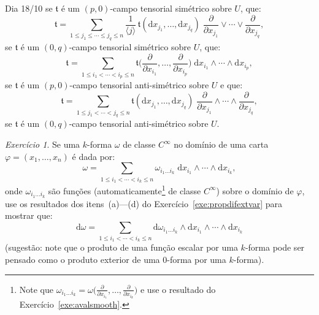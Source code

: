 \documentclass[oneside,11pt]{amsart}
\newcommand{\dd}{\mathrm d}
\theoremstyle{remark}\newtheorem{exercise}{Exercício}[section]
\theoremstyle{plain}\newtheorem{teo}{Teorema}[section]
\theoremstyle{plain}\newtheorem{lem}[teo]{Lema}
\theoremstyle{plain}\newtheorem{prop}[teo]{Proposição}
\theoremstyle{definition}\newtheorem{defin}[teo]{Definição}
\theoremstyle{remark}\newtheorem{rem}[teo]{Observação}
\theoremstyle{definition}\newtheorem{example}[teo]{Exemplo}
\numberwithin{equation}{section}
\begin{document}
\begin{section}{Dia 18/10}
se $\mathfrak t$ é um $(p,0)$-campo tensorial simétrico sobre $U$, que:
\[\mathfrak t=\sum_{1\le j_1\le\cdots\le j_q\le n}
\frac1{\langle j\rangle}\,\mathfrak t(\dd x_{j_1},\ldots,\dd x_{j_q})\;\frac{\partial}{\partial x_{j_1}}\vee\cdots\vee\frac{\partial}{\partial x_{j_q}},\]
se $\mathfrak t$ é um $(0,q)$-campo tensorial simétrico sobre $U$, que:
\begin{equation}\label{eq:formascoordenadas}
\mathfrak t=\sum_{1\le i_1<\cdots<i_p\le n}
\mathfrak t\Big(\frac{\partial}{\partial x_{i_1}},\ldots,\frac{\partial}{\partial x_{i_p}}\Big)\;\dd x_{i_1}\wedge\cdots\wedge\dd x_{i_p},
\end{equation}
se $\mathfrak t$ é um $(p,0)$-campo tensorial anti-simétrico sobre $U$ e que:
\[\mathfrak t=\sum_{1\le j_1<\cdots<j_q\le n}
\mathfrak t(\dd x_{j_1},\ldots,\dd x_{j_q})\;\frac{\partial}{\partial x_{j_1}}\wedge\cdots\wedge\frac{\partial}{\partial x_{j_q}},\]
se $\mathfrak t$ é um $(0,q)$-campo tensorial anti-simétrico sobre $U$.

\begin{exercise}
Se uma $k$-forma $\omega$ de classe $C^\infty$ no domínio de uma carta $\varphi=(x_1,\ldots,x_n)$ é dada por:
\[\omega=\sum_{1\le i_1<\cdots<i_k\le n}\omega_{i_1\ldots i_k}\;\dd x_{i_1}\wedge\cdots\wedge\dd x_{i_k},\]
onde $\omega_{i_1\ldots i_k}$ são funções (automaticamente\footnote{%
Note que $\omega_{i_1\ldots i_k}=\omega\big(\frac{\partial}{\partial x_{i_1}},\ldots,\frac{\partial}{\partial x_{i_k}}\big)$ e use o resultado
do Exercício~\ref{exe:avalsmooth}.}
de classe $C^\infty$) sobre o domínio de $\varphi$,
use os resultados dos itens~(a)---(d) do Exercício~\ref{exe:propdifextvar} para mostrar que:
\[\dd\omega=\sum_{1\le i_1<\cdots<i_k\le n}\dd\omega_{i_1\ldots i_k}\wedge\dd x_{i_1}\wedge\cdots\wedge\dd x_{i_k}\]
(sugestão: note que o produto de uma função escalar por uma $k$-forma pode ser pensado como o produto exterior de uma $0$-forma por uma $k$-forma).
\end{exercise}

\end{section}
\end{document}
